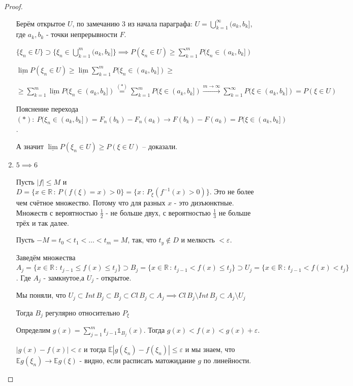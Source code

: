 \begin{proof}
\begin{enumerate}
{            Берём открытое $U$, по замечанию 3 из начала параграфа: $U =  \bigcup\limits_{k = 1}^{\infty} (a_k, b_k]$, где $a_k, b_k$ - точки непрерывности $F$.

            $\{ \xi_n \in U \} \supset \{ \xi_n \in \bigcup\limits_{k = 1}^{m} (a_k, b_k] \} \implies P(\xi_n \in U) \geqslant \sum_{k = 1}^m P(\xi_n \in (a_k, b_k])$

            $\underline{\lim} P(\xi_n \in U) \geqslant \underline{\lim} \sum_{k = 1}^m P(\xi_n \in (a_k, b_k]) \geqslant$

            $\geqslant \sum_{k = 1}^m \underline{\lim} P(\xi_n \in (a_k, b_k]) \overset{(*)}{=} \sum_{k = 1}^m P(\xi \in (a_k, b_k]) \overset{m \to \infty}{\rightarrow} \sum_{k = 1}^{\infty} P(\xi \in (a_k, b_k]) = P(\xi \in U)$

            Пояснение перехода $(*): \ P(\xi_n \in (a_k, b_k]) = F_n (b_k) - F_n (a_k) \rightarrow F(b_k) - F(a_k) = P(\xi \in (a_k, b_k])$.

            А значит $\underline{\lim} P(\xi_n \in U) \geqslant P(\xi \in U)$ -- доказали.
        }
        \item {
            $5 \implies 6$

            Пусть $|f| \leqslant M$ и $D = \{ x \in \mathbb{R} \, : \, P(f(\xi) = x) > 0 \} = \{ x \, : \, P_{\xi} (f^{-1} (x) > 0) \}$. Это не более чем счётное множество. Потому что для разных $x$ - это дизъюнктные.
            Множеств с вероятностью $\frac{1}{2}$ - не больше двух, с вероятностью $\frac{1}{3}$ не больше трёх и так далее.

            Пусть $-M = t_0 < t_1 < \ldots < t_m = M$, так, что $t_y \not \in D$ и мелкость $< \varepsilon$.

            Заведём множества $A_j = \{ x \in \mathbb{R} \, : \, t_{j - 1} \leqslant f(x) \leqslant t_j \} \supset B_j = \{ x \in \mathbb{R} \, : \, t_{j - 1} < f(x) \leqslant t_j \} \supset U_j = \{ x \in \mathbb{R} \, : \, t_{j - 1} < f(x) < t_j \}$. Где $A_j$ - замкнутое,а $U_j$ - открытое.

            Мы поняли, что $U_j \subset Int \, B_j \subset B_j \subset Cl \, B_j \subset A_j \implies Cl \, B_j \setminus Int \, B_j \subset A_j \setminus U_j$

            Тогда $B_j$ регулярно относительно $P_\xi$

            Определим $g(x) = \sum_{j = 1}^{m} t_{j - 1} \mathds{1}_{B_j} (x)$. Тогда $g(x) < f(x) < g(x) + \varepsilon$.

            $|g(x) - f(x)| < \varepsilon$ и тогда $\mathbb{E} |g(\xi_n) - f(\xi_n)| \leqslant \varepsilon$ и мы знаем, что $\mathbb{E}g(\xi_n) \rightarrow \mathbb{E}g(\xi)$ - видно, если расписать матожидание $g$ по линейности.

}
\end{enumerate}
\end{proof}

